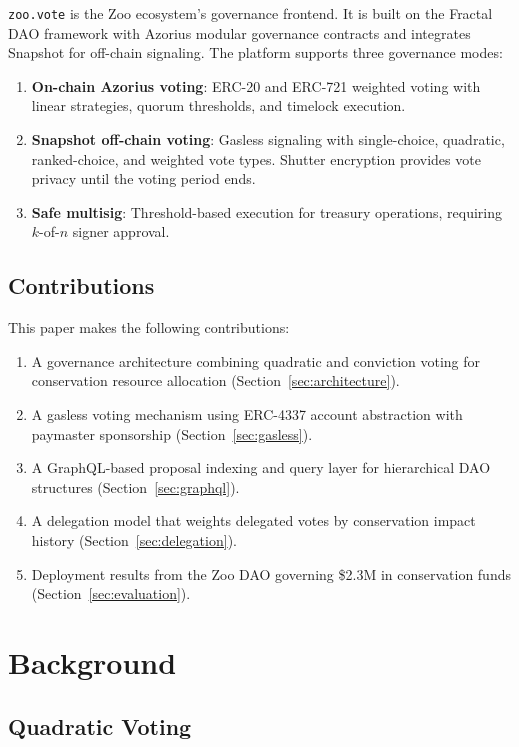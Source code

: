 \documentclass[11pt,letterpaper]{article}
\begin{document}
\texttt{zoo.vote} is the Zoo ecosystem's governance frontend. It is built on the Fractal DAO framework with Azorius modular governance contracts and integrates Snapshot for off-chain signaling. The platform supports three governance modes:

\begin{enumerate}
    \item \textbf{On-chain Azorius voting}: ERC-20 and ERC-721 weighted voting with linear strategies, quorum thresholds, and timelock execution.
    \item \textbf{Snapshot off-chain voting}: Gasless signaling with single-choice, quadratic, ranked-choice, and weighted vote types. Shutter encryption provides vote privacy until the voting period ends.
    \item \textbf{Safe multisig}: Threshold-based execution for treasury operations, requiring $k$-of-$n$ signer approval.
\end{enumerate}

\subsection{Contributions}

This paper makes the following contributions:

\begin{enumerate}
    \item A governance architecture combining quadratic and conviction voting for conservation resource allocation (Section~\ref{sec:architecture}).
    \item A gasless voting mechanism using ERC-4337 account abstraction with paymaster sponsorship (Section~\ref{sec:gasless}).
    \item A GraphQL-based proposal indexing and query layer for hierarchical DAO structures (Section~\ref{sec:graphql}).
    \item A delegation model that weights delegated votes by conservation impact history (Section~\ref{sec:delegation}).
    \item Deployment results from the Zoo DAO governing \$2.3M in conservation funds (Section~\ref{sec:evaluation}).
\end{enumerate}

\section{Background}

\subsection{Quadratic Voting}
\end{document}
